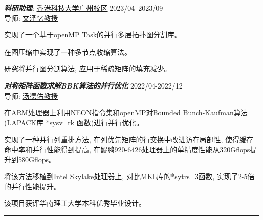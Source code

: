 \documentclass[10pt]{article}
\newenvironment{outerlist}[1][\enskip\textbullet]%
        {%
        \begin{itemize}[label=#1, itemsep=1pt]}{\end{itemize}%
         \vspace{-0.6\baselineskip}}
\newenvironment{innerlist}[1][\enskip$\circ$]%
        {\begin{compactitem}[#1]}{\end{compactitem}}
\begin{document}
\begin{outerlist}
 \item {\it\textbf{科研助理}}: \href{https://hkust-gz.edu.cn/zh/?variant=zh-cn}{香港科技大学广州校区} \hfill 2023/04--2023/09\\
        导师: \href{https://zeyiwen.github.io/}{文泽忆教授}
        \begin{innerlist}
                \item 实现了一个基于openMP Task的并行多层拓扑图分割库。
                \item 在图压缩中实现了一种多节点收缩算法。
                \item 研究将并行图分割算法, 应用于稀疏矩阵的填充减少。
        \end{innerlist}
 	
 \item {\it \textbf{对称矩阵函数求解BBK算法的并行优化}} \hfill 2022/04-2022/12\\
 	导师: \href{http://www2.scut.edu.cn/sse/2018/0614/c16789a270678/page.htm}{汤德佑教授}
        \begin{innerlist}
                \item 在ARM处理器上利用NEON指令集和openMP对Bounded Bunch-Kaufman算法(LAPACK库 *sysv\_rk 函数)进行并行优化。
                \item 实现了一种并行列重排方法, 在列优先矩阵的行交换中改进访存局部性, 使得缓存命中率和并行性能得到提高, 在鲲鹏920-6426处理器上的单精度性能从320Gflops提升到580Gflops。
                \item 将该方法移植到Intel Skylake处理器上, 对比MKL库的*sytrs\_3函数, 实现了2-5倍的并行性能提升。
                \item 该项目获评华南理工大学本科优秀毕业设计。
        \end{innerlist}

\end{outerlist}
\noindent\rule{\textwidth}{1pt}
\end{document}

